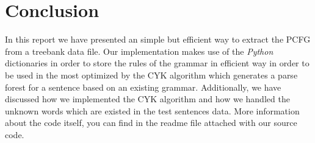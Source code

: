 \documentclass[a4paper,11pt]{article}
\begin{document}
\section{Conclusion}
\label{concl}
In this report we have presented an simple but efficient way to extract the PCFG from a
treebank data file. Our implementation makes use of the \textit{Python} dictionaries in order to store the rules of the grammar in efficient way in order to be used in the most optimized by the CYK algorithm which generates a parse forest for a sentence based on
an existing grammar. Additionally, we have discussed how we implemented the CYK algorithm and how we handled the unknown words which are existed in the test sentences data. More information about the code itself, you can find in the readme file attached with our source code.
\end{document}
